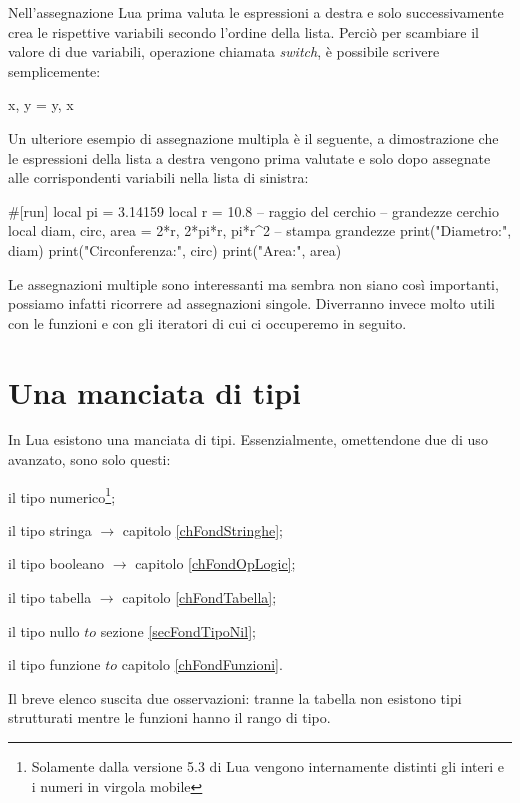 Nell'assegnazione Lua prima valuta le espressioni a destra e solo
successivamente crea le rispettive variabili secondo l'ordine della lista.
Perciò per scambiare il valore di due variabili, operazione chiamata
\emph{switch}, è possibile scrivere semplicemente:
\begin{lines}
x, y = y, x
\end{lines}

Un ulteriore esempio di assegnazione multipla è il seguente, a dimostrazione
che le espressioni della lista a destra vengono prima valutate e solo dopo
assegnate alle corrispondenti variabili nella lista di sinistra:
\begin{lines}
#[run]
local pi = 3.14159
local r = 10.8 -- raggio del cerchio
-- grandezze cerchio
local diam, circ, area = 2*r, 2*pi*r, pi*r^2
-- stampa grandezze
print("Diametro:", diam)
print("Circonferenza:", circ)
print("Area:", area)
\end{lines}

Le assegnazioni multiple sono interessanti ma sembra non siano così importanti,
possiamo infatti ricorrere ad assegnazioni singole. Diverranno invece molto
utili con le funzioni e con gli iteratori di cui ci occuperemo in seguito.


\section{Una manciata di tipi}
\label{secFondManciataTipi}

In Lua esistono una manciata di tipi. Essenzialmente, omettendone due di uso
avanzato, sono solo questi:
\begin{compactitemize}
\item {} il tipo numerico\footnote{Solamente dalla versione 5.3 di Lua
vengono internamente distinti gli interi e i numeri in virgola mobile};
\item {} il tipo stringa \( \to \) capitolo \ref{chFondStringhe};
\item {} il tipo booleano \( \to \) capitolo \ref{chFondOpLogic};
\item {} il tipo tabella \( \to \) capitolo \ref{chFondTabella};
\item {} il tipo nullo \( to \) sezione \ref{secFondTipoNil};
\item {} il tipo funzione \( to \) capitolo \ref{chFondFunzioni}.
\end{compactitemize}

Il breve elenco suscita due osservazioni: tranne la tabella non esistono
tipi strutturati mentre le funzioni hanno il rango di tipo.

